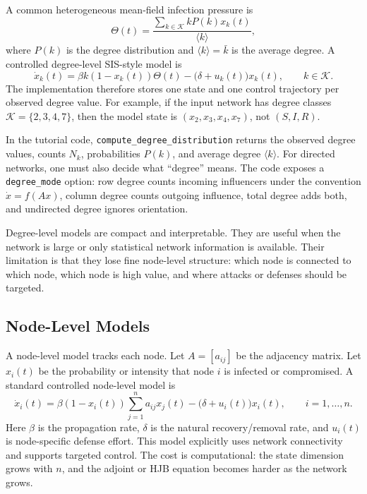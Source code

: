 \documentclass[11pt,a4paper]{article}
\begin{document}
A common heterogeneous mean-field infection pressure is
\begin{equation}
  \Theta(t)=\frac{\sum_{k\in\mathcal{K}} kP(k)x_k(t)}{\langle k\rangle},
  \label{eq:theta-degree}
\end{equation}
where $P(k)$ is the degree distribution and $\langle k\rangle=\bar{k}$ is the average degree. A controlled degree-level SIS-style model is
\begin{equation}
  \dot{x}_k(t)=\beta k(1-x_k(t))\Theta(t)-\bigl(\delta+u_k(t)\bigr)x_k(t),
  \qquad k\in\mathcal{K}.
  \label{eq:degree-sis}
\end{equation}
The implementation therefore stores one state and one control trajectory per observed degree value. For example, if the input network has degree classes $\mathcal{K}=\{2,3,4,7\}$, then the model state is $(x_2,x_3,x_4,x_7)$, not $(S,I,R)$.

In the tutorial code, \texttt{compute\_degree\_distribution} returns the observed degree values, counts $N_k$, probabilities $P(k)$, and average degree $\langle k\rangle$. For directed networks, one must also decide what ``degree'' means. The code exposes a \texttt{degree\_mode} option: row degree counts incoming influencers under the convention $\dot{x}=f(Ax)$, column degree counts outgoing influence, total degree adds both, and undirected degree ignores orientation.

Degree-level models are compact and interpretable. They are useful when the network is large or only statistical network information is available. Their limitation is that they lose fine node-level structure: which node is connected to which node, which node is high value, and where attacks or defenses should be targeted.

\subsection{Node-Level Models}

A node-level model tracks each node. Let $A=[a_{ij}]$ be the adjacency matrix. Let $x_i(t)$ be the probability or intensity that node $i$ is infected or compromised. A standard controlled node-level model is
\begin{equation}
  \dot{x}_i(t)=\beta(1-x_i(t))\sum_{j=1}^n a_{ij}x_j(t)-\bigl(\delta+u_i(t)\bigr)x_i(t),\qquad i=1,\dots,n.
  \label{eq:node-sis}
\end{equation}
Here $\beta$ is the propagation rate, $\delta$ is the natural recovery/removal rate, and $u_i(t)$ is node-specific defense effort. This model explicitly uses network connectivity and supports targeted control. The cost is computational: the state dimension grows with $n$, and the adjoint or HJB equation becomes harder as the network grows.
\end{document}
